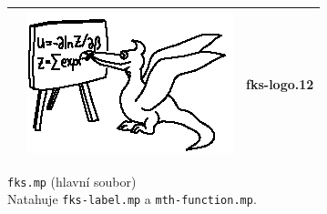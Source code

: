 \documentclass[a4paper,10pt]{article}
\begin{document}
\begin{tabularx}{\textwidth}{|l|l|X|}
    &\includegraphics{fks-logo_12}& fks-logo.12\\\hline
\end{tabularx}\bigskip

{\centering\large\texttt{fks.mp} (hlavní soubor)\nopagebreak\\\medskip\noindent}
Natahuje {\tt fks-label.mp} a {\tt mth-function.mp}.\nopagebreak\\
\end{document}
